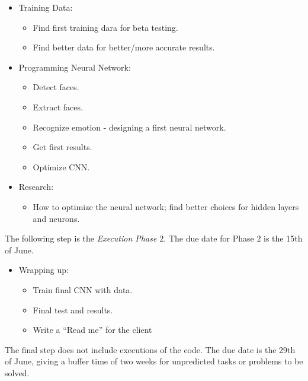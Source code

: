 \documentclass[]{article}
\begin{document}
\begin{itemize}
\item Training Data:
	\begin{itemize}
	\item Find first training dara for beta testing.
	\item Find better data for better/more accurate results.
	\end{itemize}

\item Programming Neural Network:
	\begin{itemize}
	\item Detect faces.
	\item Extract faces.
	\item Recognize emotion - designing a first neural network.
	\item Get first results.
	\item Optimize CNN.
	\end{itemize}
	
\item Research:
	\begin{itemize}
	\item How to optimize the neural network; find better choices for hidden layers and neurons. 
	\end{itemize}
\end{itemize}

The following step is the \textit{Execution Phase $2$}. The due date for Phase $2$ is the 15th of June.

\begin{itemize}

\item Wrapping up:
	\begin{itemize}
	\item Train final CNN with data.
	\item Final test and results.
	\item Write a ``Read me'' for the client
	\end{itemize}

\end{itemize}

The final step does not include executions of the code. The due date is the 29th of June, giving a buffer time of two weeks for unpredicted tasks or problems to be solved.
\end{document}
